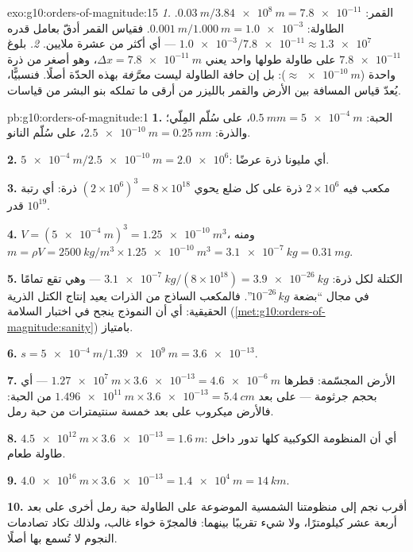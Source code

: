 \begin{solution}{exo:g10:orders-of-magnitude:15}
\emph{1.} القمر: $\qty{0.03}{m}/\qty{3.84e8}{m} = \num{7.8e-11}$.
الطاولة: $\qty{0.001}{m}/\qty{1.000}{m} = \num{1.0e-3}$. فقياس القمر
أدقّ بعامل قدره
$\num{1.0e-3}/\num{7.8e-11} \approx \num{1.3e7}$ --- أي أكثر من عشرة ملايين.
\emph{2.} بلوغ $\num{7.8e-11}$ على طاولة طولها  واحد يعني
$\Delta x = \qty{7.8e-11}{m}$، وهو أصغر من ذرة واحدة
($\approx \qty{e-10}{m}$): بل إن حافة الطاولة ليست \emph{معرَّفة}
بهذه الحدّة أصلًا. فنسبيًّا، يُعدّ قياس المسافة بين الأرض والقمر
بالليزر من أرقى ما تملكه بنو البشر من قياسات.
\end{solution}

\begin{solution}{pb:g10:orders-of-magnitude:1}
\textbf{1.} الحبة: $\qty{0.5}{mm} = \qty{5e-4}{m}$، على سُلّم المِلّي؛
والذرة: $\qty{2.5e-10}{m} = \qty{0.25}{nm}$، على سُلّم النانو.

\textbf{2.} $\qty{5e-4}{m}/\qty{2.5e-10}{m} = \num{2.0e6}$: أي
مليونا ذرة عرضًا.

\textbf{3.} مكعب فيه $2 \times 10^{6}$ ذرة على كل ضلع يحوي
$(2\times10^{6})^{3} = 8 \times 10^{18}$ ذرة: أي رتبة قدر
$10^{19}$.

\textbf{4.} $V = (\qty{5e-4}{m})^{3} = \qty{1.25e-10}{m^3}$، ومنه
$m = \rho V = \qty{2500}{kg/m^3} \times \qty{1.25e-10}{m^3}
= \qty{3.1e-7}{kg} = \qty{0.31}{mg}$.

\textbf{5.} الكتلة لكل ذرة:
$\qty{3.1e-7}{kg}/(8\times10^{18}) = \qty{3.9e-26}{kg}$ --- وهي تقع تمامًا
في مجال ``بضعة $10^{-26}\,\unit{kg}$''. فالمكعب الساذج من الذرات
يعيد إنتاج الكتل الذرية الحقيقية: أي أن النموذج ينجح في اختبار السلامة
(\cref{met:g10:orders-of-magnitude:sanity}) بامتياز.

\textbf{6.} $s = \qty{5e-4}{m}/\qty{1.39e9}{m} = \num{3.6e-13}$.

\textbf{7.} الأرض المجسّمة: قطرها
$\qty{1.27e7}{m} \times \num{3.6e-13} = \qty{4.6e-6}{m}$ --- أي بحجم
جرثومة --- على بعد
$\qty{1.496e11}{m} \times \num{3.6e-13} = \qty{5.4}{cm}$ من
الحبة: فالأرض ميكروب على بعد خمسة سنتيمترات من حبة رمل.

\textbf{8.} $\qty{4.5e12}{m} \times \num{3.6e-13} = \qty{1.6}{m}$: أي أن
المنظومة الكوكبية كلها تدور داخل طاولة طعام.

\textbf{9.} $\qty{4.0e16}{m} \times \num{3.6e-13} = \qty{1.4e4}{m}
= \qty{14}{km}$.

\textbf{10.} أقرب نجم إلى منظومتنا الشمسية الموضوعة على الطاولة حبة
رمل أخرى على بعد أربعة عشر كيلومترًا، ولا شيء تقريبًا
بينهما: فالمجرّة خواء غالب، ولذلك
تكاد تصادمات النجوم لا تُسمع بها أصلًا.


\end{solution}
